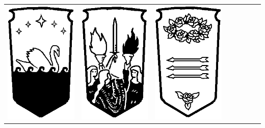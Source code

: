 \begin{center}
\begin{tabular}{@{}cccccccc@{}}
\includegraphics[width=\finallogosize]{pics/logo_fleet.png} &
\includegraphics[width=\finallogosize]{pics/logo_warden.png} &
\includegraphics[width=\finallogosize]{pics/logo_queen.png} &

\end{tabular}
\end{center}
